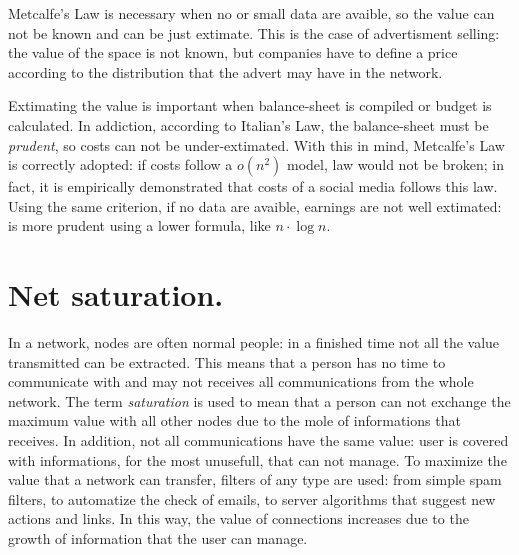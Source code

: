\documentclass[12pt, a4page]{article}
\begin{document}
Metcalfe's Law is necessary when no or small data are avaible, so the value can not be known and can be just extimate.
This is the case of advertisment selling: the value of the space is not known, but companies have to define a price according to the distribution that the advert may have in the network. \newline
 
Extimating the value is important when balance-sheet is compiled or budget is calculated. In addiction, according to Italian's Law, the balance-sheet must be \textit{prudent}, so costs can not be under-extimated.
With this in mind, Metcalfe's Law is correctly adopted: if costs follow a $o(n^2)$ model, law would not be broken; in fact, it is empirically demonstrated%
 that costs of a social media follows this law.
Using the same criterion, if no data are avaible, earnings are not well extimated: is more prudent using a lower formula, like $n \cdot \log{n}$. \newline

\section{Net saturation.}
In a network, nodes are often normal people: in a finished time not all the value transmitted can be extracted.
This means that a person has no time to communicate with and may not receives all communications from the whole network.
The term \textit{saturation} is used to mean that a person can not exchange the maximum value with all other nodes due to the mole of informations that receives.
In addition, not all communications have the same value: user is covered with informations, for the most unusefull, that can not manage. \newline
To maximize the value that a network can transfer, filters of any type are used: from simple spam filters, to automatize the check of emails, to server algorithms that suggest new actions and links.
In this way, the value of connections increases due to the growth of information that the user can manage. \newline
\end{document}
